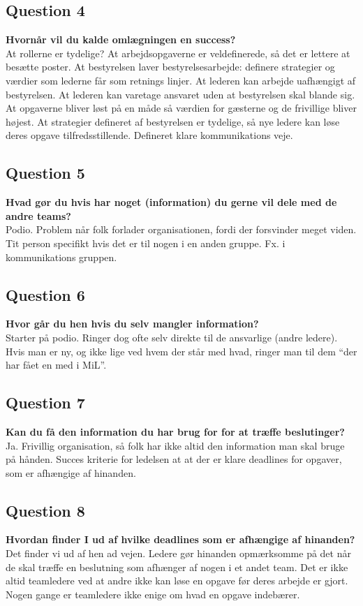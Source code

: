 \subsection{Question 4}
\label{i4q4}
\noindent \textbf{Hvornår vil du kalde omlægningen en success?} \\
At rollerne er tydelige? At arbejdsopgaverne er veldefinerede, så det er lettere at besætte poster. At bestyrelsen laver bestyrelsesarbejde: definere strategier og værdier som lederne får som retnings linjer. At lederen kan arbejde uafhængigt af bestyrelsen. At lederen kan varetage ansvaret uden at bestyrelsen skal blande sig. At opgaverne bliver løst på en måde så værdien for gæsterne og de frivillige bliver højest. At strategier defineret af bestyrelsen er tydelige, så nye ledere kan løse deres opgave tilfredsstillende. Defineret klare kommunikations veje.

\subsection{Question 5}
\label{i4q5}
\noindent \textbf{Hvad gør du hvis har noget (information) du gerne vil dele med de andre teams?} \\
Podio. Problem når folk forlader organisationen, fordi der forsvinder meget viden. Tit person specifikt hvis det er til nogen i en anden gruppe. Fx. i kommunikations gruppen.

\subsection{Question 6}
\label{i4q6}
\noindent \textbf{Hvor går du hen hvis du selv mangler information?} \\
Starter på podio. Ringer dog ofte selv direkte til de ansvarlige (andre ledere). Hvis man er ny, og ikke lige ved hvem der står med hvad, ringer man til dem “der har fået en med i MiL”.


\subsection{Question 7}
\label{i4q7}
\noindent \textbf{Kan du få den information du har brug for for at træffe beslutinger?} \\
Ja. Frivillig organisation, så folk har ikke altid den information man skal bruge på hånden. 
Succes kriterie for ledelsen at at der er klare deadlines for opgaver, som er afhængige af hinanden.

\subsection{Question 8}
\label{i4q8}
\noindent \textbf{Hvordan finder I ud af hvilke deadlines som er afhængige af hinanden?} \\
Det finder vi ud af hen ad vejen. Ledere gør hinanden opmærksomme på det når de skal træffe en beslutning som afhænger af nogen i et andet team. Det er ikke altid teamledere ved at andre ikke kan løse en opgave før deres arbejde er gjort. Nogen gange er teamledere ikke enige om hvad en opgave indebærer.

